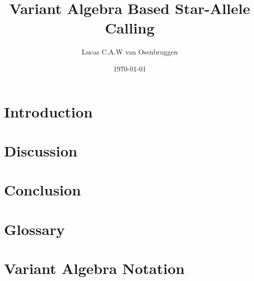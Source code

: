 \documentclass[a4paper, 10pt]{article}
\title{Variant Algebra Based Star-Allele Calling\\}
\author[1]{Lucas C.A.W van Osenbruggen}
\affil[1]{Leiden Institute of Advanced Computer Science, Leiden University}
\date{\today}
\begin{document}
%
\maketitle
\thispagestyle{fancy}
\newpage
%
\begin{abstract}
    
\end{abstract}
\newpage
%
\tableofcontents
\newpage
%
\section{Introduction}
\label{section:Introduction}

\newpage
%
%
\section{Discussion}
\label{section:Discussion}

\newpage
%
\section{Conclusion}
\label{section:Conclusion}

\newpage
%
\printbibliography
\newpage
%
\begin{appendix}
    \section{Glossary}
    \label{appendix:Glossary}
    \printglossaries
    \newpage
    \section{Variant Algebra Notation}
    \label{appendix:Notation}
    
\end{appendix}
%
\end{document}
